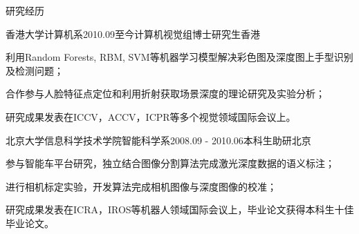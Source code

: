 \documentclass{cv_professional-cn} %
\begin{document}
\begin{rSection}{研究经历}
    
\begin{rSubsection}{香港大学计算机系}{2010.09至今}{计算机视觉组博士研究生}{香港}
	\item 利用Random Forests, RBM, SVM等机器学习模型解决彩色图及深度图上手型识别及检测问题；
	\item 合作参与人脸特征点定位和利用折射获取场景深度的理论研究及实验分析；
	\item 研究成果发表在ICCV，ACCV，ICPR等多个视觉领域国际会议上。
\end{rSubsection}

\begin{rSubsection}{北京大学信息科学技术学院智能科学系}{2008.09 - 2010.06}{本科生助研}{北京}
    \item 参与智能车平台研究，独立结合图像分割算法完成激光深度数据的语义标注；
    \item 进行相机标定实验，开发算法完成相机图像与深度图像的校准；
    \item 研究成果发表在ICRA，IROS等机器人领域国际会议上，毕业论文获得本科生十佳毕业论文。
\end{rSubsection}

\end{rSection}

\end{document}
